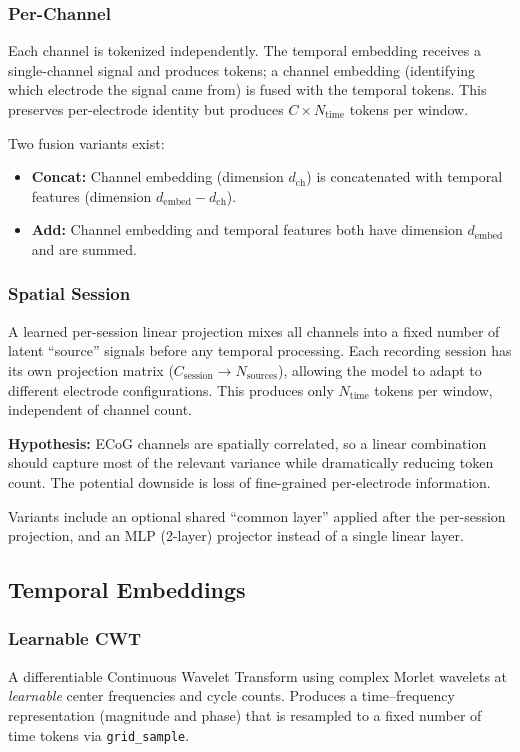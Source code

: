\documentclass[11pt, a4paper]{article}
\begin{document}
\subsubsection{Per-Channel}
Each channel is tokenized independently. The temporal embedding receives
a single-channel signal and produces tokens; a channel embedding
(identifying which electrode the signal came from) is fused with the
temporal tokens. This preserves per-electrode identity but produces
$C \times N_\text{time}$ tokens per window.

Two fusion variants exist:
\begin{itemize}[nosep]
      \item \textbf{Concat:} Channel embedding (dimension $d_\text{ch}$) is
            concatenated with temporal features (dimension
            $d_\text{embed} - d_\text{ch}$).
      \item \textbf{Add:} Channel embedding and temporal features both have
            dimension $d_\text{embed}$ and are summed.
\end{itemize}

\subsubsection{Spatial Session}
A learned per-session linear projection mixes all channels into a fixed
number of latent ``source'' signals before any temporal processing. Each
recording session has its own projection matrix
($C_\text{session} \to N_\text{sources}$), allowing the model to
adapt to different electrode configurations. This produces only
$N_\text{time}$ tokens per window, independent of channel count.

\textbf{Hypothesis:} ECoG channels are spatially correlated, so a linear
combination should capture most of the relevant variance while
dramatically reducing token count. The potential downside is loss of
fine-grained per-electrode information.

Variants include an optional shared ``common layer'' applied after the
per-session projection, and an MLP (2-layer) projector instead of a
single linear layer.

\subsection{Temporal Embeddings}

\subsubsection{Learnable CWT}
A differentiable Continuous Wavelet Transform using complex Morlet
wavelets at \emph{learnable} center frequencies and cycle counts.
Produces a time--frequency representation (magnitude and phase) that is
resampled to a fixed number of time tokens via \texttt{grid\_sample}.
\end{document}
